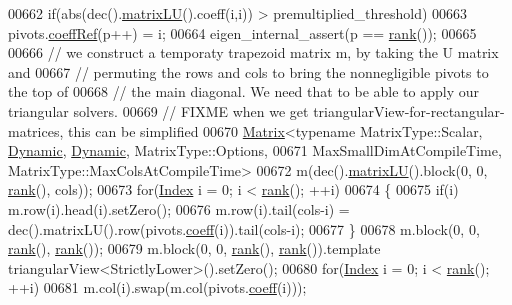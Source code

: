 \begin{DoxyCode}
00662       \textcolor{keywordflow}{if}(abs(dec().\hyperlink{group___l_u___module_afea0b8fc707a9097d46fe358cb18bbff}{matrixLU}().coeff(i,i)) > premultiplied\_threshold)
00663         pivots.\hyperlink{class_eigen_1_1_plain_object_base_a25626a55b26a4323565f79d1b7c48ea8}{coeffRef}(p++) = i;
00664     eigen\_internal\_assert(p == \hyperlink{group___l_u___module_a67a870aa69e699e058d04802ba0bdad9}{rank}());
00665 
00666     \textcolor{comment}{// we construct a temporaty trapezoid matrix m, by taking the U matrix and}
00667     \textcolor{comment}{// permuting the rows and cols to bring the nonnegligible pivots to the top of}
00668     \textcolor{comment}{// the main diagonal. We need that to be able to apply our triangular solvers.}
00669     \textcolor{comment}{// FIXME when we get triangularView-for-rectangular-matrices, this can be simplified}
00670     \hyperlink{group___core___module_class_eigen_1_1_matrix}{Matrix}<\textcolor{keyword}{typename} MatrixType::Scalar, \hyperlink{namespace_eigen_ad81fa7195215a0ce30017dfac309f0b2}{Dynamic}, \hyperlink{namespace_eigen_ad81fa7195215a0ce30017dfac309f0b2}{Dynamic}, MatrixType::Options,
00671            MaxSmallDimAtCompileTime, MatrixType::MaxColsAtCompileTime>
00672       m(dec().\hyperlink{group___l_u___module_afea0b8fc707a9097d46fe358cb18bbff}{matrixLU}().block(0, 0, \hyperlink{group___l_u___module_a67a870aa69e699e058d04802ba0bdad9}{rank}(), cols));
00673     \textcolor{keywordflow}{for}(\hyperlink{namespace_eigen_a62e77e0933482dafde8fe197d9a2cfde}{Index} i = 0; i < \hyperlink{group___l_u___module_a67a870aa69e699e058d04802ba0bdad9}{rank}(); ++i)
00674     \{
00675       \textcolor{keywordflow}{if}(i) m.row(i).head(i).setZero();
00676       m.row(i).tail(cols-i) = dec().matrixLU().row(pivots.\hyperlink{class_eigen_1_1_plain_object_base_afbfc12954f16d21aedb7bd839f64a278}{coeff}(i)).tail(cols-i);
00677     \}
00678     m.block(0, 0, \hyperlink{group___l_u___module_a67a870aa69e699e058d04802ba0bdad9}{rank}(), \hyperlink{group___l_u___module_a67a870aa69e699e058d04802ba0bdad9}{rank}());
00679     m.block(0, 0, \hyperlink{group___l_u___module_a67a870aa69e699e058d04802ba0bdad9}{rank}(), \hyperlink{group___l_u___module_a67a870aa69e699e058d04802ba0bdad9}{rank}()).template triangularView<StrictlyLower>().setZero();
00680     \textcolor{keywordflow}{for}(\hyperlink{namespace_eigen_a62e77e0933482dafde8fe197d9a2cfde}{Index} i = 0; i < \hyperlink{group___l_u___module_a67a870aa69e699e058d04802ba0bdad9}{rank}(); ++i)
00681       m.col(i).swap(m.col(pivots.\hyperlink{class_eigen_1_1_plain_object_base_afbfc12954f16d21aedb7bd839f64a278}{coeff}(i)));

\end{DoxyCode}
